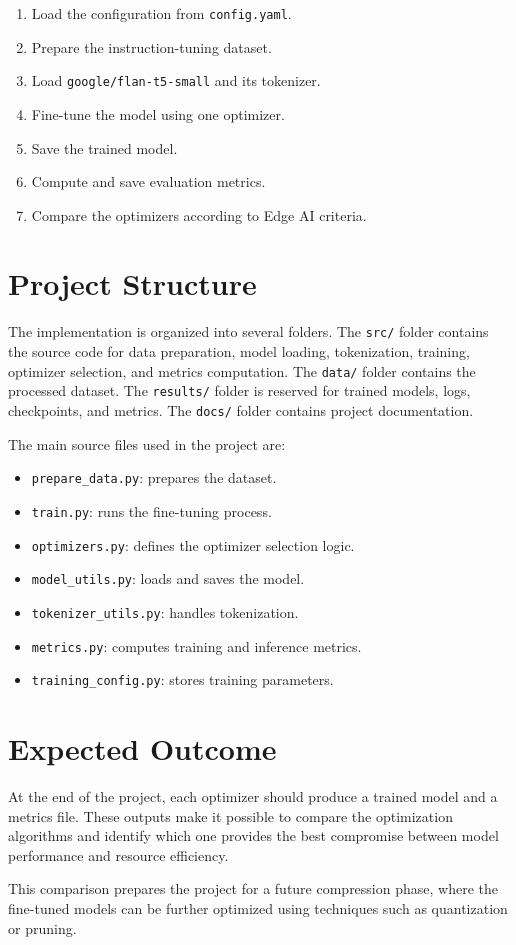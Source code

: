 \begin{enumerate}
    \item Load the configuration from \texttt{config.yaml}.
    \item Prepare the instruction-tuning dataset.
    \item Load \texttt{google/flan-t5-small} and its tokenizer.
    \item Fine-tune the model using one optimizer.
    \item Save the trained model.
    \item Compute and save evaluation metrics.
    \item Compare the optimizers according to Edge AI criteria.
\end{enumerate}

\section{Project Structure}

The implementation is organized into several folders. The \texttt{src/} folder
contains the source code for data preparation, model loading, tokenization,
training, optimizer selection, and metrics computation. The \texttt{data/}
folder contains the processed dataset. The \texttt{results/} folder is reserved
for trained models, logs, checkpoints, and metrics. The \texttt{docs/} folder
contains project documentation.

\vspace*{0.15cm}

The main source files used in the project are:

\begin{itemize}
    \item \texttt{prepare\_data.py}: prepares the dataset.
    \item \texttt{train.py}: runs the fine-tuning process.
    \item \texttt{optimizers.py}: defines the optimizer selection logic.
    \item \texttt{model\_utils.py}: loads and saves the model.
    \item \texttt{tokenizer\_utils.py}: handles tokenization.
    \item \texttt{metrics.py}: computes training and inference metrics.
    \item \texttt{training\_config.py}: stores training parameters.
\end{itemize}

\section{Expected Outcome}

At the end of the project, each optimizer should produce a trained model and a
metrics file. These outputs make it possible to compare the optimization
algorithms and identify which one provides the best compromise between model
performance and resource efficiency.

\vspace*{0.15cm}

This comparison prepares the project for a future compression phase, where the
fine-tuned models can be further optimized using techniques such as quantization
or pruning.
